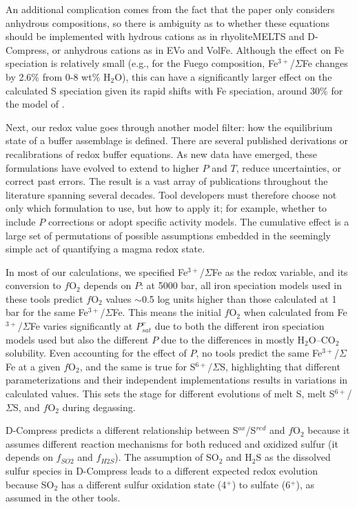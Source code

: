 \documentclass[draft, english]{volcanica-template}
\begin{document}
An additional complication comes from the fact that the \textcite{Kress1991} paper only considers anhydrous compositions, so there is ambiguity as to whether these equations should be implemented with hydrous cations as in rhyoliteMELTS \parencite{GhiorsoGualda2015} and D-Compress, or anhydrous cations as in EVo and VolFe. Although the effect on Fe speciation is relatively small (e.g., for the Fuego composition, Fe$^{3+}$/$\Sigma$Fe changes by 2.6\% from 0-8 wt\% H$_2$O), this can have a significantly larger effect on the calculated S speciation given its rapid shifts with Fe speciation, around 30\% for the model of \textcite{Nash2019}.

Next, our redox value goes through another model filter: how the equilibrium state of a buffer assemblage is defined. There are several published derivations or recalibrations of redox buffer equations. As new data have emerged, these formulations have evolved to extend to higher $P$ and $T$, reduce uncertainties, or correct past errors. The result is a vast array of publications throughout the literature spanning several decades. Tool developers must therefore choose not only which formulation to use, but how to apply it; for example, whether to include $P$ corrections or adopt specific activity models. The cumulative effect is a large set of permutations of possible assumptions embedded in the seemingly simple act of quantifying a magma redox state.

In most of our calculations, we specified Fe$^{3+}$/$\Sigma$Fe as the redox variable, and its conversion to $f$O$_2$ depends on $P$: at 5000 bar, all iron speciation models used in these tools predict $f$O$_2$ values $\sim$0.5 log units higher than those calculated at 1 bar for the same Fe$^{3+}$/$\Sigma$Fe. This means the initial $f$O$_2$ when calculated from Fe$^{3+}$/$\Sigma$Fe varies significantly at $P^v_{sat}$ due to both the different iron speciation models used but also the different $P$ due to the differences in mostly H$_2$O–CO$_2$ solubility. Even accounting for the effect of $P$, no tools predict the same Fe$^{3+}$/$\Sigma$Fe at a given $f$O$_2$, and the same is true for S$^{6+}$/$\Sigma$S, highlighting that different parameterizations and their independent implementations results in variations in calculated values. This sets the stage for different evolutions of melt S, melt S$^{6+}$/$\Sigma$S, and $f$O$_2$ during degassing.

D-Compress predicts a different relationship between S$^{ox}$/S$^{red}$ and $f$O$_2$ because it assumes different reaction mechanisms for both reduced and oxidized sulfur (it depends on $f_{SO2}$ and $f_{H2S}$). The assumption of SO$_2$ and H$_2$S as the dissolved sulfur species in D-Compress leads to a different expected redox evolution because SO$_2$ has a different sulfur oxidation state (4$^+$) to sulfate (6$^+$), as assumed in the other tools. 
\end{document}
